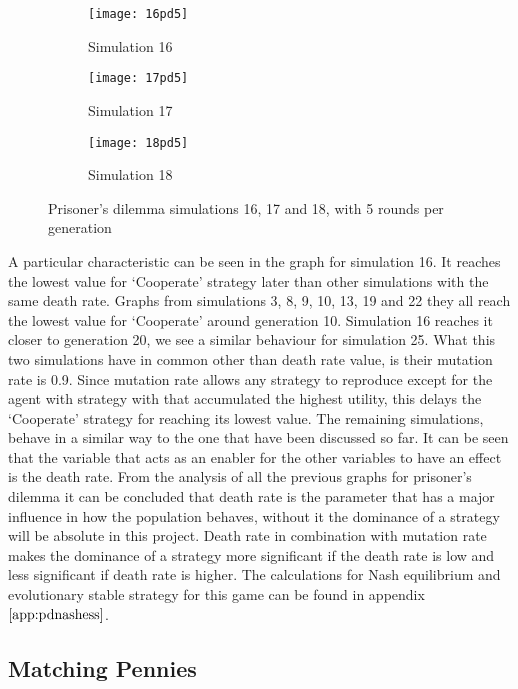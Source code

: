 \begin{figure}[H]       
    \centering
    \begin{subfigure}[b]{0.3\textwidth}
	\centering
	{\texttt{[image: 16pd5]}}   
    	\caption{Simulation 16}
	\label{fig:pds16}
    \end{subfigure}
    \hfill
    \begin{subfigure}[b]{0.3\textwidth}
	\centering
	{\texttt{[image: 17pd5]}}   
    	\caption{Simulation 17}
	\label{fig:pds17}
    \end{subfigure}
    \hfill
    \begin{subfigure}[b]{0.3\textwidth}
	\centering
	{\texttt{[image: 18pd5]}}   
    	\caption{Simulation 18}
	\label{fig:pds18}
    \end{subfigure}
    \caption{Prisoner's dilemma simulations 16, 17 and 18, with 5 rounds per generation}
    \label{pdsim161718r5}
\end{figure}

A particular characteristic can be seen in the graph for simulation 16. It reaches the lowest value for `Cooperate' strategy later than other simulations with the same death rate. Graphs from simulations 3, 8, 9, 10, 13, 19 and 22 they all reach the lowest value for `Cooperate' around generation 10. Simulation 16 reaches it closer to generation 20, we see a similar behaviour for simulation 25. What this two simulations have in common other than death rate value, is their mutation rate is 0.9. Since mutation rate allows any strategy to reproduce except for the agent with strategy with that accumulated the highest utility, this delays the `Cooperate' strategy for reaching its lowest value.		  
The remaining simulations, behave in a similar way to the one that have been discussed  so far. It can be seen that the variable that acts as an enabler for the other variables to have an effect is the death rate. 
From the analysis of all the previous graphs for prisoner's dilemma it can be concluded that death rate is the parameter that has a major influence in how the population behaves, without it the dominance of a strategy will be absolute in this project. Death rate in combination with mutation rate makes the dominance of a strategy more significant if the death rate is low and less significant if death rate is higher.
The calculations for Nash equilibrium and evolutionary stable strategy for this game can be found in appendix $\ref{app:pdnashess}$.

\subsection{Matching Pennies}

